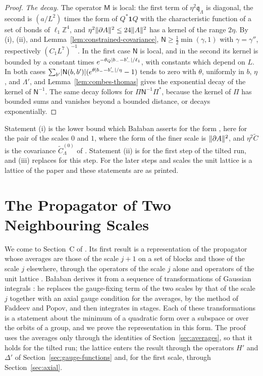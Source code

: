 \documentclass[11pt]{preprint}
\DeclarePairedDelimiter{\abs}{\lvert}{\rvert}
\DeclarePairedDelimiter{\norm}{\lVert}{\rVert}
\numberwithin{equation}{section}
\theoremstyle{definition}
\theoremstyle{remark}
\theoremstyle{plain}
\begin{document}
\begin{proof}
\emph{The decay.} The operator $\mathsf M$ is local: the first term of $\eta^2\mathfrak q_\Lambda$ is diagonal, the second is $(a/L^2)$ times the form of $Q^*\mathbf 1Q$ with the characteristic function of a set of bonds of $\ell_1\mathbb Z^4$, and $\eta^2\norm{\partial A}^2 \leq 24\norm A^2$ has a kernel of the range $2\eta$. By (i), (ii), and Lemma~\ref{lem:constrained-covariance}, $\mathsf N \geq \frac12\min(\gamma, 1)$ with $\gamma = \gamma''$, respectively $(C_1L^7)^{-1}$. In the first case $\mathsf N$ is local, and in the second its kernel is bounded by a constant times $e^{-\theta_Q\abs{b_- - b'_-}/\ell_1}$, with constants which depend on $L$. In both cases $\sum_{b'}\abs{\mathsf N(b, b')}(e^{\theta\abs{b_- - b'_-}/\eta} - 1)$ tends to zero with $\theta$, uniformly in $b$, $\eta$, and $\Lambda'$, and Lemma~\ref{lem:combes-thomas} gives the exponential decay of the kernel of $\mathsf N^{-1}$. The same decay follows for $\Pi\mathsf N^{-1}\Pi^*$, because the kernel of $\Pi$ has bounded sums and vanishes beyond a bounded distance, or decays exponentially.
\end{proof}

Statement (i) is the lower bound which Ba{\l}aban asserts for the form \cite[(2.122)]{BalabanPRT2}, here for the pair of the scales $0$ and $1$, where the form of the finer scale is $\norm{\partial A}^2$, and $\eta^2\tilde C$ is the covariance $\tilde C^{(0)}_\Lambda$ of \cite[(2.129)]{BalabanPRT2}. Statement (ii) is \cite[(2.153)]{BalabanPRT2} for the first step of the tilted run, and (iii) replaces \cite[(2.154)--(2.157)]{BalabanPRT2} for this step. For the later steps and scales the unit lattice is a lattice of the paper and these statements are as printed.

\section{The Propagator of Two Neighbouring Scales}\label{sec:two-scale-propagator}

We come to Section~C of \cite{BalabanPRT2}. Its first result is a representation of the propagator whose averages are those of the scale $j + 1$ on a set of blocks and those of the scale $j$ elsewhere, through the operators of the scale $j$ alone and operators of the unit lattice \cite[(2.129), p.~246]{BalabanPRT2}. Ba{\l}aban derives it from a sequence of transformations of Gaussian integrals \cite[(2.95)--(2.119)]{BalabanPRT2}: he replaces the gauge-fixing term of the two scales by that of the scale $j$ together with an axial gauge condition for the averages, by the method of Faddeev and Popov, and then integrates in stages. Each of these transformations is a statement about the minimum of a quadratic form over a subspace or over the orbits of a group, and we prove the representation in this form. The proof uses the averages only through the identities of Section~\ref{sec:averages}, so that it holds for the tilted run; the lattice enters the result through the operators $H'$ and $\Delta'$ of Section~\ref{sec:gauge-functions} and, for the first scale, through Section~\ref{sec:axial}.
\end{document}
